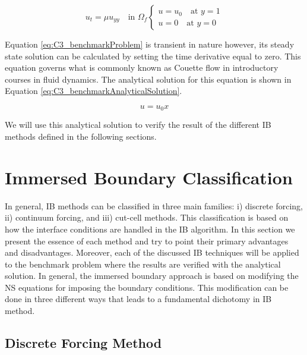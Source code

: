 \begin{subequations}\label{eq:C3_benchmarkProblem}
\begin{equation}
	u_t = \mu u_{yy} \quad \text{in } \Omega_f
\end{equation}
\begin{equation}
\begin{cases}
	u = u_0 \quad \text{at } y = 1 \\
	u = 0 \quad \text{at } y = 0
\end{cases}
\end{equation}
\end{subequations}

Equation \eqref{eq:C3_benchmarkProblem} is transient in nature however, its steady state solution can be calculated by setting the time derivative equal to zero. This equation governs what is commonly known as Couette flow in introductory courses in fluid dynamics. The analytical solution for this equation is shown in Equation \eqref{eq:C3_benchmarkAnalyticalSolution}.

\begin{equation}\label{eq:C3_benchmarkAnalyticalSolution}
	u = u_0 x
\end{equation}

We will use this analytical solution to verify the result of the different IB methods defined in the following sections.

\section{Immersed Boundary Classification}
In general, IB methods can be classified in three main families: i) discrete forcing, ii) continuum forcing, and iii) cut-cell methods. This classification is based on how the interface conditions are handled in the IB algorithm. In this section we present the essence of each method and try to point their primary advantages and disadvantages. Moreover, each of the discussed IB techniques will be applied to the benchmark problem where the results are verified with the analytical solution. In general, the immersed boundary approach is based on modifying the NS equations for imposing the boundary conditions. This modification can be done in three different ways that leads to a fundamental dichotomy in IB method.

\subsection{Discrete Forcing Method}

